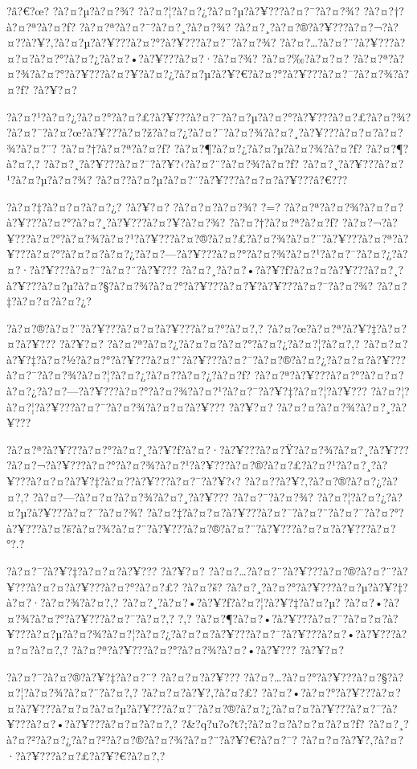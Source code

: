 \documentclass[11pt, openany]{book}
\begin{document}
{{{{{{{{{{{{{{{{?â?€?œ? ?à?¤?µ?à?¤?¾? ?à?¤?¦?à?¤?¿?à?¤?µ?à?¥???à?¤?¯?à?¤?¾?
?à?¤?†?à?¤?ª?à?¤?ƒ? ?à?¤?ª?à?¤?¯?à?¤?¸?à?¤?¾?
?à?¤?¸?à?¤?®?à?¥???à?¤?¬?à?¤?­?à?¥?‚?à?¤?µ?à?¥???à?¤?°?à?¥???à?¤?¯?à?¤?¾?
?à?¤?\ldots{}?à?¤?¨?à?¥???à?¤?¤?à?¤?°?à?¤?¿?à?¤?•?à?¥???à?¤?·?à?¤?¾?
?à?¤?‰?à?¤?¤?
?à?¤?ª?à?¤?¾?à?¤?°?à?¥???à?¤?¥?à?¤?¿?à?¤?µ?à?¥?€?à?¤?°?à?¥???à?¤?¯?à?¤?¾?à?¤?ƒ?
?à?¥?¤?

?à?¤?¹?à?¤?¿?à?¤?°?à?¤?£?à?¥???à?¤?¯?à?¤?µ?à?¤?°?à?¥???à?¤?£?à?¤?¾?
?à?¤?¯?à?¤?œ?à?¥???à?¤?ž?à?¤?¿?à?¤?¯?à?¤?¾?à?¤?¸?à?¥???à?¤?¤?à?¤?¾?à?¤?¨?
?à?¤?†?à?¤?ª?à?¤?ƒ? ?à?¤?¶?à?¤?¿?à?¤?µ?à?¤?¾?à?¤?ƒ? ?à?¤?¶?à?¤?‚?
?à?¤?¸?à?¥???à?¤?¯?à?¥?‹?à?¤?¨?à?¤?¾?à?¤?ƒ?
?à?¤?¸?à?¥???à?¤?¹?à?¤?µ?à?¤?¾?
?à?¤?­?à?¤?µ?à?¤?¨?à?¥???à?¤?¤?à?¥???â?€???

?à?¤?‡?à?¤?¤?à?¤?¿? ?à?¥?¤? ?à?¤?¤?à?¤?¾? ?=?
?à?¤?ª?à?¤?¾?à?¤?¤?à?¥???à?¤?°?à?¤?¸?à?¥???à?¤?¥?à?¤?¾?
?à?¤?†?à?¤?ª?à?¤?ƒ?
?à?¤?¬?à?¥???à?¤?°?à?¤?¾?à?¤?¹?à?¥???à?¤?®?à?¤?£?à?¤?¾?à?¤?¨?à?¥???à?¤?ª?à?¥???à?¤?°?à?¤?¤?à?¤?¿?à?¤?---?à?¥???à?¤?°?à?¤?¾?à?¤?¹?à?¤?¯?à?¤?¿?à?¤?·?à?¥???à?¤?¯?à?¤?¨?à?¥???
?à?¤?¸?à?¤?•?à?¥?ƒ?à?¤?¤?à?¥???à?¤?¸?à?¥???à?¤?µ?à?¤?§?à?¤?¾?à?¤?°?à?¥???à?¤?¥?à?¥???à?¤?¯?à?¤?¾?
?à?¤?‡?à?¤?¤?à?¤?¿?

?à?¤?®?à?¤?¨?à?¥???à?¤?¤?à?¥???à?¤?°?à?¤?‚?
?à?¤?œ?à?¤?ª?à?¥?‡?à?¤?¤?à?¥??? ?à?¥?¤?
?à?¤?ª?à?¤?¿?à?¤?¤?à?¤?°?à?¤?¿?à?¤?¦?à?¤?‚?
?à?¤?¤?à?¥?‡?à?¤?½?à?¤?°?à?¥???à?¤?˜?à?¥???à?¤?¯?à?¤?®?à?¤?¿?à?¤?¤?à?¥???à?¤?¯?à?¤?¾?à?¤?¦?à?¤?¿?à?¤?­?à?¤?¿?à?¤?ƒ?
?à?¤?ª?à?¥???à?¤?°?à?¤?¤?à?¤?¿?à?¤?---?à?¥???à?¤?°?à?¤?¾?à?¤?¹?à?¤?¯?à?¥?‡?à?¤?¦?à?¥???
?à?¤?¦?à?¤?¦?à?¥???à?¤?¯?à?¤?¾?à?¤?¤?à?¥??? ?à?¥?¤?
?à?¤?¤?à?¤?¾?à?¤?¸?à?¥???

?à?¤?ª?à?¥???à?¤?°?à?¤?¸?à?¥?ƒ?à?¤?·?à?¥???à?¤?Ÿ?à?¤?¾?à?¤?¸?à?¥???
?à?¤?¬?à?¥???à?¤?°?à?¤?¾?à?¤?¹?à?¥???à?¤?®?à?¤?£?à?¤?¹?à?¤?¸?à?¥???à?¤?¤?à?¥?‡?à?¤?­?à?¥???à?¤?¯?à?¥?‹?
?à?¤?­?à?¥?‚?à?¤?®?à?¤?¿?à?¤?‚? ?à?¤?---?à?¤?¤?à?¤?¾?à?¤?¸?à?¥???
?à?¤?¯?à?¤?¾? ?à?¤?¦?à?¤?¿?à?¤?µ?à?¥???à?¤?¯?à?¤?¾?
?à?¤?‡?à?¤?¤?à?¥???à?¤?¯?à?¤?¨?à?¤?¯?à?¤?°?à?¥???à?¤?š?à?¤?¾?à?¤?¨?à?¥???à?¤?®?à?¤?¨?à?¥???à?¤?¤?à?¥???à?¤?°?.?

?à?¤?¯?à?¥?‡?à?¤?¤?à?¥??? ?à?¥?¤?
?à?¤?\ldots{}?à?¤?¨?à?¥???à?¤?®?à?¤?¨?à?¥???à?¤?¤?à?¥???à?¤?°?à?¤?£?
?à?¤?š? ?à?¤?¸?à?¤?°?à?¥???à?¤?µ?à?¥?‡?à?¤?·?à?¤?¾?à?¤?‚?
?à?¤?¸?à?¤?•?à?¥?ƒ?à?¤?¦?à?¥?‡?à?¤?µ?
?à?¤?•?à?¤?¾?à?¤?°?à?¥???à?¤?¯?à?¤?‚? ?,?
?à?¤?¶?à?¤?•?à?¥???à?¤?¯?à?¤?¤?à?¥???à?¤?µ?à?¤?¾?à?¤?¦?à?¤?¿?à?¤?¤?à?¥???à?¤?¯?à?¥???à?¤?•?à?¥???à?¤?¤?à?¤?‚?
?à?¤?ª?à?¥???à?¤?°?à?¤?¾?à?¤?•?à?¥??? ?à?¥?¤?

?à?¤?¯?à?¤?®?à?¥?‡?à?¤?¨? ?à?¤?¤?à?¥???
?à?¤?\ldots{}?à?¤?°?à?¥???à?¤?§?à?¤?¦?à?¤?¾?à?¤?¨?à?¤?‚?
?à?¤?¤?à?¥?‚?à?¤?£?
?à?¤?•?à?¤?°?à?¥???à?¤?¤?à?¥???à?¤?¤?à?¤?µ?à?¥???à?¤?¯?à?¤?®?à?¤?¿?à?¤?¤?à?¥???à?¤?¯?à?¥???à?¤?•?à?¥???à?¤?¤?à?¤?‚?
?\&?q?u?o?t?;?à?¤?¤?à?¤?¤?à?¤?ƒ?
?à?¤?¸?à?¤?²?à?¤?¿?à?¤?²?à?¤?®?à?¤?¾?à?¤?¨?à?¥?€?à?¤?¯?
?à?¤?¤?à?¥?‚?à?¤?·?à?¥???à?¤?£?à?¥?€?à?¤?‚?

}}}}}}}}}}}}}}}}
\end{document}
